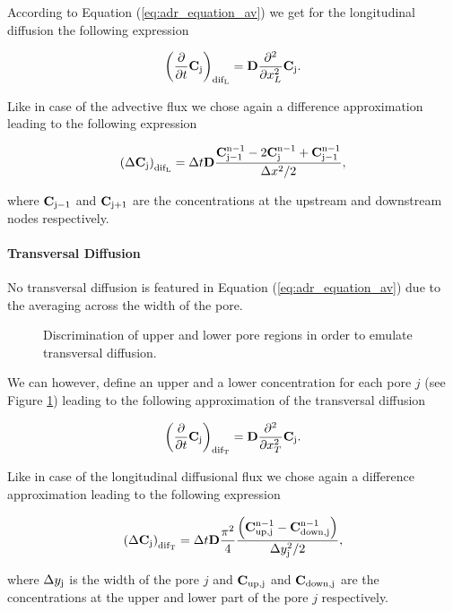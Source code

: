 \documentclass[12pt]{report}
\newcommand*{\PsTricksPath}{pstricks}
\begin{document}
According to Equation (\ref{eq:adr_equation_av}) we get for the longitudinal diffusion the following expression

$$
	 \left( \frac{\partial}{\partial t} {\bf C}_{\rm{j}} \right)_{\rm{dif_L}} = {\bf D} \frac{\partial^2}{\partial x_L^2} {\bf C}_{\rm{j}}.
$$

Like in case of the advective flux we chose again a difference approximation leading to the following expression

$$
	\left( \Delta {\bf C}_{\rm{j}} \right)_{\rm{dif_L}} =  \Delta t {\bf D} \frac{ {\bf C}^{\rm{n} - 1}_{\rm{j-1}}  - 2 {\bf C}^{\rm{n} - 1}_{\rm{j}} + {\bf C}^{\rm{n} - 1}_{\rm{j-1}} }{\Delta x^2/2 },
$$

where ${\bf C}_{\rm{j-1}}$ and ${\bf C}_{\rm{j+1}}$ are the concentrations at the upstream and downstream nodes respectively. 

\paragraph*{Transversal Diffusion}

No transversal diffusion is featured in Equation (\ref{eq:adr_equation_av}) due to the averaging across the width of the pore.

\begin{figure}[ht]
	\centering
	
	\caption{Discrimination of upper and lower pore regions in order to emulate transversal diffusion.}
	\label{fig:PoreStructure03}
\end{figure}

We can however, define an upper and a lower concentration for each pore $j$ (see Figure \ref{fig:PoreStructure03}) leading to the following approximation of the transversal diffusion

$$
	 \left( \frac{\partial}{\partial t} {\bf C}_{\rm{j}} \right)_{\rm{dif_T}} = {\bf D} \frac{\partial^2}{\partial x_T^2} {\bf C}_{\rm{j}}.
$$

Like in case of the longitudinal diffusional flux we chose again a difference approximation leading to the following expression

$$
	\left( \Delta {\bf C}_{\rm{j}} \right)_{\rm{dif_T}} = \Delta t {\bf D} \frac{\pi^2}{4} \frac{ \left( {\bf C}^{\rm{n} - 1}_{\rm{up,j}} - {\bf C}^{\rm{n} - 1}_{\rm{down,j}} \right)}{\Delta y^2_{\rm{j}}/2},
$$

where $\Delta y_{\rm{j}}$ is the width of the pore $j$ and ${\bf C}_{\rm{up,j}}$ and ${\bf C}_{\rm{down,j}}$ are the concentrations at the upper and lower part of the pore $j$ respectively. 
\end{document}
